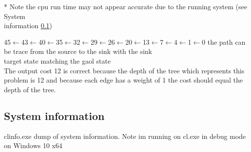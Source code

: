 \documentclass[12pt]{article}
\begin{document}
* Note the cpu run time may not appear accurate due to the running system (see System \\ information \ref{sysinfo})


45$\leftarrow$43$\leftarrow$40$\leftarrow$35$\leftarrow$32$\leftarrow$29$\leftarrow$26$\leftarrow$20$\leftarrow$13$\leftarrow$7$\leftarrow$4$\leftarrow$1$\leftarrow$0
the path can be trace from the source to the sink with the sink\\target state matching the gaol state
\\
The output cost 12 is correct because the depth of the tree which represents
this problem is 12 and because each edge has a weight of 1 the cost should equal the depth of the tree.

\subsection{System information}\label{sysinfo}
clinfo.exe dump of system information. 
Note im running on cl.exe in debug mode on Windows 10 x64
\end{document}

